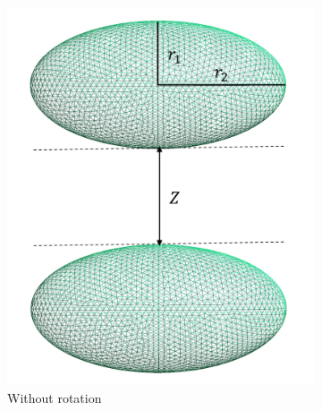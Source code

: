 \begin{figure}[H]
    \begin{subfigure}{\linewidth}
        \centering
        \includegraphics[scale = 0.3]{figures/two_ellipsoids}
        \caption{Without rotation}
        \label{Without rotation}
        \end{subfigure}\\[1ex]
    \begin{subfigure}[t]{.5\linewidth}
    \centering

\end{subfigure}
\end{figure}
